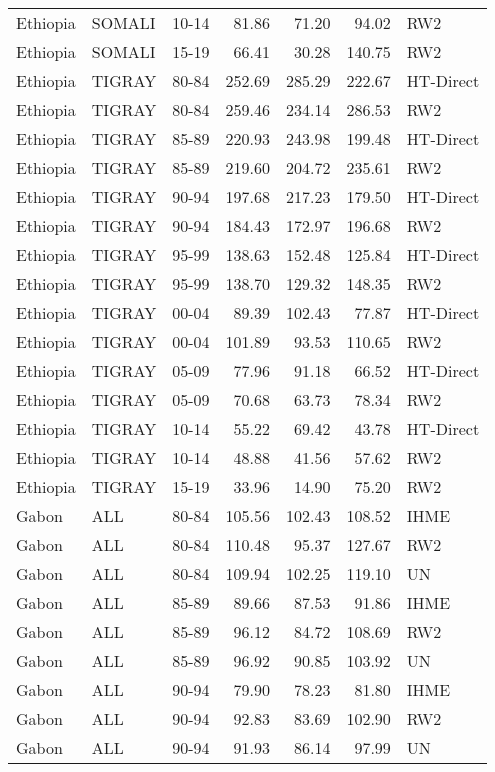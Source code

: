 \begin{longtable}{lllrrrl}
  Ethiopia & SOMALI & 10-14 & 81.86 & 71.20 & 94.02 & RW2 \\ 
  Ethiopia & SOMALI & 15-19 & 66.41 & 30.28 & 140.75 & RW2 \\ 
  Ethiopia & TIGRAY & 80-84 & 252.69 & 285.29 & 222.67 & HT-Direct \\ 
  Ethiopia & TIGRAY & 80-84 & 259.46 & 234.14 & 286.53 & RW2 \\ 
  Ethiopia & TIGRAY & 85-89 & 220.93 & 243.98 & 199.48 & HT-Direct \\ 
  Ethiopia & TIGRAY & 85-89 & 219.60 & 204.72 & 235.61 & RW2 \\ 
  Ethiopia & TIGRAY & 90-94 & 197.68 & 217.23 & 179.50 & HT-Direct \\ 
  Ethiopia & TIGRAY & 90-94 & 184.43 & 172.97 & 196.68 & RW2 \\ 
  Ethiopia & TIGRAY & 95-99 & 138.63 & 152.48 & 125.84 & HT-Direct \\ 
  Ethiopia & TIGRAY & 95-99 & 138.70 & 129.32 & 148.35 & RW2 \\ 
  Ethiopia & TIGRAY & 00-04 & 89.39 & 102.43 & 77.87 & HT-Direct \\ 
  Ethiopia & TIGRAY & 00-04 & 101.89 & 93.53 & 110.65 & RW2 \\ 
  Ethiopia & TIGRAY & 05-09 & 77.96 & 91.18 & 66.52 & HT-Direct \\ 
  Ethiopia & TIGRAY & 05-09 & 70.68 & 63.73 & 78.34 & RW2 \\ 
  Ethiopia & TIGRAY & 10-14 & 55.22 & 69.42 & 43.78 & HT-Direct \\ 
  Ethiopia & TIGRAY & 10-14 & 48.88 & 41.56 & 57.62 & RW2 \\ 
  Ethiopia & TIGRAY & 15-19 & 33.96 & 14.90 & 75.20 & RW2 \\ 
  Gabon & ALL & 80-84 & 105.56 & 102.43 & 108.52 & IHME \\ 
  Gabon & ALL & 80-84 & 110.48 & 95.37 & 127.67 & RW2 \\ 
  Gabon & ALL & 80-84 & 109.94 & 102.25 & 119.10 & UN \\ 
  Gabon & ALL & 85-89 & 89.66 & 87.53 & 91.86 & IHME \\ 
  Gabon & ALL & 85-89 & 96.12 & 84.72 & 108.69 & RW2 \\ 
  Gabon & ALL & 85-89 & 96.92 & 90.85 & 103.92 & UN \\ 
  Gabon & ALL & 90-94 & 79.90 & 78.23 & 81.80 & IHME \\ 
  Gabon & ALL & 90-94 & 92.83 & 83.69 & 102.90 & RW2 \\ 
  Gabon & ALL & 90-94 & 91.93 & 86.14 & 97.99 & UN \\ 

\end{longtable}
